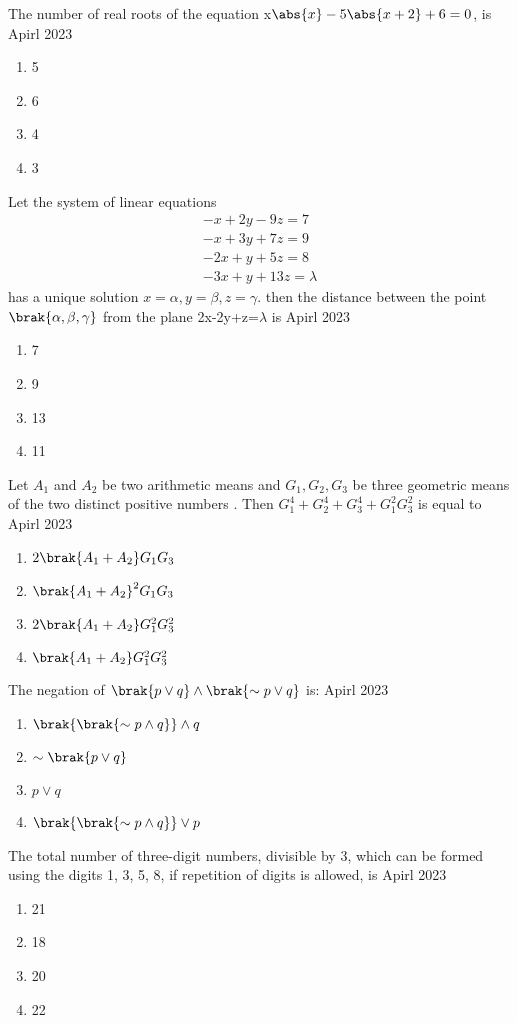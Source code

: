 \iffalse
\title{Assignment}
\author{EE24BTECH11038}
\section{mcq-single}
\fi
\item The number of real roots of the equation x$\abs{x}-5\abs{x+2}+6=0$, is \hfill{Apirl 2023}
\begin{enumerate}
    \item 5
    \item 6
    \item 4
    \item 3
\end{enumerate}
\bigskip
\item  Let the system of linear equations 
\begin{align*}
-x+2y-9z=7\\
-x+3y+7z=9\\
-2x+y+5z=8\\
-3x+y+13z=\lambda
\end{align*}
has a unique solution $x=\alpha,y=\beta,z=\gamma$. then the distance between the point $\brak{\alpha,\beta,\gamma}$ from the plane 2x-2y+z=$\lambda$ is \hfill{Apirl 2023}
\begin{enumerate}
    \item 7
    \item 9
    \item 13
    \item 11
\end{enumerate}
\bigskip
\item Let $A_1$ and $A_2$ be two  arithmetic means and $G_1,G_2,G_3$ be three geometric means of the two distinct positive numbers . Then $G_1^{4}+G_2^{4}+G_3^{4}+G_1^{2}G_3^{2}$ is equal to \hfill{Apirl 2023}
\begin{enumerate}
    \item $2\brak{A_1+A_2}G_1G_3$
    \item $\brak{A_1+A_2}^2G_1G_3$
    \item $2\brak{A_1+A_2}G_1^{2}G_3^{2}$
     \item $\brak{A_1+A_2}G_1^{2}G_3^{2}$
\end{enumerate}
\bigskip
\item The negation of $ \brak{p \lor q} \land \brak{\sim p \lor q} $ is: \hfill{Apirl 2023}
\begin{enumerate}
    \item $\brak{\brak{\sim p \land q}}\land q$
    \item $\sim\brak{p\lor q}$
    \item $p\lor q$
    \item $\brak{\brak{\sim p \land q}}\lor p$
\end{enumerate}
\bigskip
\item The total number of three-digit numbers, divisible by 3, which can be formed using the digits 1, 3, 5, 8, if
repetition of digits is allowed, is \hfill{Apirl 2023}
\begin{enumerate}
    \item 21
    \item 18
    \item 20
    \item 22
\end{enumerate}
